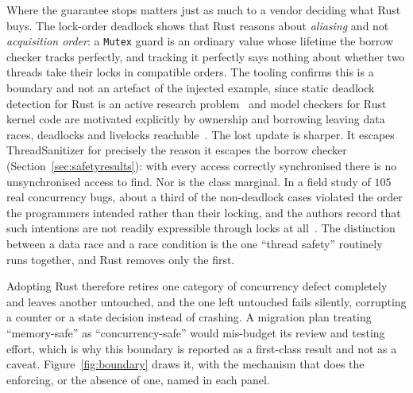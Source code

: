 Where the guarantee stops matters just as much to a vendor deciding what Rust buys. The lock-order
deadlock shows that Rust reasons about \emph{aliasing} and not \emph{acquisition order}: a
\texttt{Mutex} guard is an ordinary value whose lifetime the borrow checker tracks perfectly, and
tracking it perfectly says nothing about whether two threads take their locks in compatible
orders. The tooling confirms this is a boundary and not an artefact of the injected example, since
static deadlock detection for Rust is an active research problem~\cite{zhang2026deadlock} and
model checkers for Rust kernel code are motivated explicitly by ownership and borrowing leaving
data races, deadlocks and livelocks reachable~\cite{tang2025converos}. The lost update is sharper.
It escapes ThreadSanitizer for precisely the reason it escapes the borrow checker
(Section~\ref{sec:safetyresults}): with every access correctly synchronised there is no
unsynchronised access to find. Nor is the class marginal. In a field study of $105$ real
concurrency bugs, about a third of the non-deadlock cases violated the order the programmers
intended rather than their locking, and the authors record that such intentions are not readily
expressible through locks at all~\cite{lu2008mistakes}. The distinction between a data race and a
race condition is the one ``thread safety'' routinely runs together, and Rust removes only the
first.

Adopting Rust therefore retires one category of concurrency defect completely and leaves another
untouched, and the one left untouched fails silently, corrupting a counter or a state decision
instead of crashing. A migration plan treating ``memory-safe'' as ``concurrency-safe'' would
mis-budget its review and testing effort, which is why this boundary is reported as a first-class
result and not as a caveat. Figure~\ref{fig:boundary} draws it, with the mechanism that does the
enforcing, or the absence of one, named in each panel.

